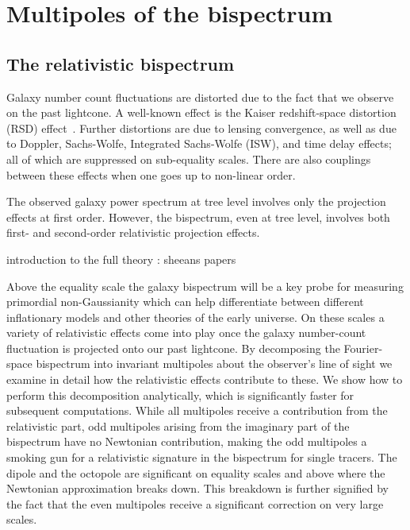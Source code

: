 \chapter{Multipoles of the bispectrum}
\label{chapter:multipoles}



\section{The relativistic bispectrum}
\label{sec:relbisp}

Galaxy number count fluctuations are distorted due to the fact that we observe on the past lightcone. A well-known effect is the Kaiser redshift-space distortion (RSD) effect~\citep{Verde:1998zr,Scoccimarro:1999ed}. Further distortions are due to lensing convergence, as well as due to Doppler, Sachs-Wolfe, Integrated Sachs-Wolfe (ISW), and time delay effects; all of which are suppressed on sub-equality scales. There are also couplings between these effects when one goes up to non-linear order. 

The observed galaxy power spectrum at tree level involves only the projection effects at first order. However, the bispectrum, even at tree level, involves both first- and second-order relativistic projection effects. 



introduction to the full theory : sheeans papers

Above the equality scale the galaxy bispectrum will be  a key probe for measuring primordial non-Gaussianity which can help differentiate between different inflationary models and other theories of the early universe. On these scales a variety of relativistic effects come into play once the galaxy number-count fluctuation is projected onto our past lightcone. By decomposing the Fourier-space bispectrum into invariant multipoles about the observer's line of sight we examine in detail how the relativistic effects contribute to these. We show how to perform this decomposition analytically, which is significantly faster for subsequent computations.  While all multipoles receive a contribution from the relativistic part, odd multipoles arising from the imaginary part of the bispectrum have no Newtonian contribution, making the odd multipoles a smoking gun for a relativistic signature in the bispectrum for single tracers.  The dipole and the octopole are significant on equality scales and above where the Newtonian approximation breaks down. This breakdown is further signified by the fact that the even multipoles receive a significant correction on very large scales.

